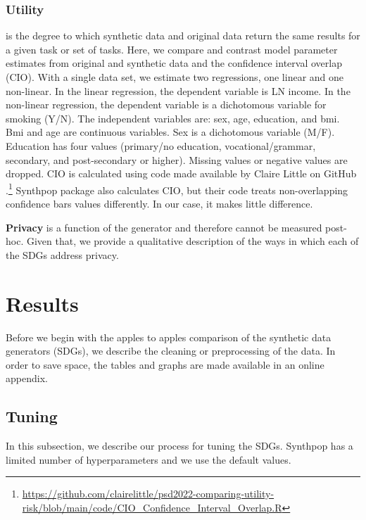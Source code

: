 \documentclass[runningheads]{llncs}
\begin{document}
\subsubsection{Utility} is the degree to which synthetic data and original data return the same results for a given task or set of tasks.  Here, we compare and contrast model parameter estimates from original and synthetic data and the confidence interval overlap (CIO).  With a single data set, we estimate two regressions, one linear and one non-linear.  In the linear regression, the dependent variable is LN income.  In the non-linear regression, the dependent variable is a dichotomous variable for smoking (Y/N).  The independent variables are: sex, age, education, and bmi.  Bmi and age are continuous variables.  Sex is a dichotomous variable (M/F).  Education has four values (primary/no education, vocational/grammar, secondary, and post-secondary or higher).  Missing values or negative values are dropped.  CIO is calculated using code made available by Claire Little on GitHub \cite{little2022comparing,karr2006framework}.\footnote{\url{https://github.com/clairelittle/psd2022-comparing-utility-risk/blob/main/code/CIO_Confidence_Interval_Overlap.R}}  Synthpop package also calculates CIO, but their code treats non-overlapping confidence bars values differently.  In our case, it makes little difference.

{\bf Privacy} is a function of the generator and therefore cannot be measured post-hoc.  Given that, we provide a qualitative description of the ways in which each of the SDGs address privacy.  

\section{Results}\label{sec:results}

Before we begin with the apples to apples comparison of the synthetic data generators (SDGs), we describe the cleaning or preprocessing of the data.  In order to save space, the tables and graphs are made available in an online appendix.  

\subsection{Tuning}

In this subsection, we describe our process for tuning the SDGs.  Synthpop has a limited number of hyperparameters and we use the default values.  
\end{document}
